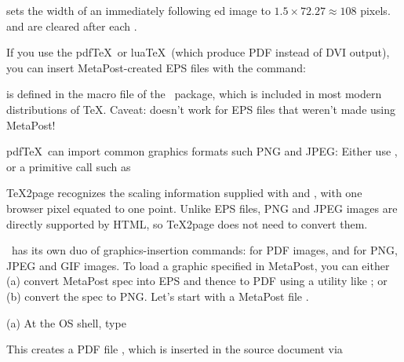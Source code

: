 {{{{{{{{{{{{{{\p{
\epsfxsize=1.5in
}

\n  sets the width of an immediately following \p{\epsfbox}ed image to
$1.5 \times 72.27 \approx 108$
pixels.
\p{\epsfxsize} and
\p{\epsfysize} are cleared after each
\p{\epsfbox}.


If you use the pdf\TeX\ or lua\TeX\ (which produce PDF
instead of DVI output), you can insert
MetaPost-created EPS files with the
\p{\convertMPtoPDF} command:


\n \p{\convertMPtoPDF} is defined in the macro file
 of the \ConTeXt\ package,
which is included in most modern distributions of \TeX.
Caveat: \p{\convertMPtoPDF} doesn’t work for EPS files
that weren’t made using MetaPost!


pdf\TeX\ can import common graphics formats
such PNG and JPEG: Either use , or a primitive call
such as


\TeX2page recognizes the scaling information supplied with \p{\pdfximage}
and ,  with one browser pixel
equated to one point.  Unlike EPS files, PNG and JPEG images are directly
supported by HTML, so \TeX2page does not need to convert them.


\XeTeX\ has its own duo of graphics-insertion commands:
\p{\XeTeXpdffile} for PDF images, and \p{\XeTeXpicfile} for PNG,
JPEG and GIF images.  To load a graphic specified in MetaPost,
you can either (a) convert MetaPost spec into EPS and
thence to PDF using a utility like ; or (b)
convert the spec to PNG. Let’s start with a MetaPost file
.

(a) At the OS shell, type


This creates a PDF file , which is inserted in
the source document via

}}}}}}}}}}}}}}
